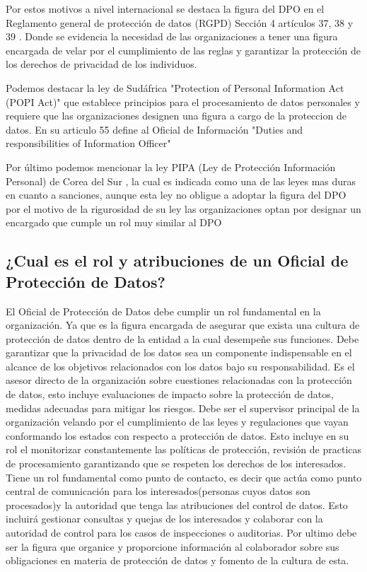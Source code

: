 \documentclass[stu, 11pt, letterpaper, donotrepeattitle, floatsintext, natbib]{apa7}
\begin{document}
Por estos motivos a nivel internacional se destaca la figura del DPO en el Reglamento general de protección de datos (RGPD) Sección 4 artículos 37, 38 y 39 \citep{rgpd}. Donde se evidencia la necesidad de las organizaciones a tener una figura encargada de velar por el cumplimiento de las reglas y garantizar la protección de los derechos de privacidad de los individuos. 

Podemos destacar la ley de Sudáfrica "Protection of Personal Information Act (POPI Act)" \citep{sudafrica} que establece principios para el procesamiento de datos personales y requiere que las organizaciones designen una figura a cargo de la proteccion de datos. En su articulo 55 define al Oficial de Información "Duties and responsibilities of Information Officer" \citep{sudafrica2} 

Por último podemos mencionar la ley PIPA (Ley de Protección Información Personal) de Corea del Sur\citep{corea} , la cual es indicada como una de las leyes mas duras en cuanto a sanciones, aunque esta ley no obligue a adoptar la figura del DPO por el motivo de la rigurosidad de su ley las organizaciones optan por designar un encargado que cumple un rol muy similar al DPO \citep{corea2}

 

\subsection{¿Cual es el rol y atribuciones de un Oficial de Protección de Datos?}

El Oficial de Protección de Datos debe cumplir un rol fundamental en la organización. Ya que es la  figura encargada de asegurar que exista una cultura de protección de datos dentro de la entidad a la cual desempeñe sus funciones. Debe garantizar que la privacidad de los datos sea un componente indispensable en el alcance de los objetivos relacionados con los datos bajo su responsabilidad.
 Es el asesor directo de la organización sobre cuestiones relacionadas con la protección de datos, esto incluye evaluaciones de impacto sobre la protección de datos, medidas adecuadas para mitigar los riesgos.
 Debe ser el supervisor principal de la organización velando por el cumplimiento de las leyes y regulaciones que vayan conformando los estados con respecto a protección de datos. Esto incluye en su rol el monitorizar constantemente las políticas de protección, revisión de practicas de procesamiento garantizando que se respeten los derechos de los interesados. 
 Tiene un rol fundamental como punto de contacto, es decir que actúa como punto central de comunicación para los interesados(personas cuyos datos son procesados)y la autoridad que tenga las atribuciones del control de datos. Esto incluirá gestionar consultas y quejas de los interesados y colaborar con la autoridad de control para los casos de inspecciones o auditorias.
 Por ultimo debe ser la figura que organice y proporcione información al colaborador sobre sus obligaciones en materia de protección de datos y fomento de la cultura de esta.
\end{document}
